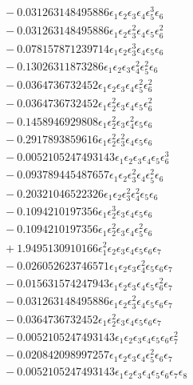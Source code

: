 \documentclass[10pt]{article}
\begin{document}
\begin{align*}
&{}  - 0.031263148495886 \epsilon_{1} \epsilon_{2} \epsilon_{3} \epsilon_{4} \epsilon_{5}^{3} \epsilon_{6} \\
&{}  - 0.031263148495886 \epsilon_{1} \epsilon_{2} \epsilon_{3}^{2} \epsilon_{4} \epsilon_{5} \epsilon_{6}^{2} \\
&{}  - 0.078157871239714 \epsilon_{1} \epsilon_{2} \epsilon_{3}^{3} \epsilon_{4} \epsilon_{5} \epsilon_{6} \\
&{}  - 0.13026311873286 \epsilon_{1} \epsilon_{2} \epsilon_{3} \epsilon_{4}^{2} \epsilon_{5}^{2} \epsilon_{6} \\
&{}  - 0.0364736732452 \epsilon_{1} \epsilon_{2} \epsilon_{3} \epsilon_{4} \epsilon_{5}^{2} \epsilon_{6}^{2} \\
&{}  - 0.0364736732452 \epsilon_{1} \epsilon_{2}^{2} \epsilon_{3} \epsilon_{4} \epsilon_{5} \epsilon_{6}^{2} \\
&{}  - 0.1458946929808 \epsilon_{1} \epsilon_{2}^{2} \epsilon_{3} \epsilon_{4}^{2} \epsilon_{5} \epsilon_{6} \\
&{}  - 0.2917893859616 \epsilon_{1} \epsilon_{2}^{2} \epsilon_{3}^{2} \epsilon_{4} \epsilon_{5} \epsilon_{6} \\
&{}  - 0.0052105247493143 \epsilon_{1} \epsilon_{2} \epsilon_{3} \epsilon_{4} \epsilon_{5} \epsilon_{6}^{3} \\
&{}  - 0.093789445487657 \epsilon_{1} \epsilon_{2} \epsilon_{3}^{2} \epsilon_{4} \epsilon_{5}^{2} \epsilon_{6} \\
&{}  - 0.20321046522326 \epsilon_{1} \epsilon_{2} \epsilon_{3}^{2} \epsilon_{4}^{2} \epsilon_{5} \epsilon_{6} \\
&{}  - 0.1094210197356 \epsilon_{1} \epsilon_{2}^{3} \epsilon_{3} \epsilon_{4} \epsilon_{5} \epsilon_{6} \\
&{}  - 0.1094210197356 \epsilon_{1} \epsilon_{2}^{2} \epsilon_{3} \epsilon_{4} \epsilon_{5}^{2} \epsilon_{6} \\
&{}  + 1.9495130910166 \epsilon_{1}^{2} \epsilon_{2} \epsilon_{3} \epsilon_{4} \epsilon_{5} \epsilon_{6} \epsilon_{7} \\
&{}  - 0.026052623746571 \epsilon_{1} \epsilon_{2} \epsilon_{3} \epsilon_{4}^{2} \epsilon_{5} \epsilon_{6} \epsilon_{7} \\
&{}  - 0.015631574247943 \epsilon_{1} \epsilon_{2} \epsilon_{3} \epsilon_{4} \epsilon_{5} \epsilon_{6}^{2} \epsilon_{7} \\
&{}  - 0.031263148495886 \epsilon_{1} \epsilon_{2} \epsilon_{3}^{2} \epsilon_{4} \epsilon_{5} \epsilon_{6} \epsilon_{7} \\
&{}  - 0.0364736732452 \epsilon_{1} \epsilon_{2}^{2} \epsilon_{3} \epsilon_{4} \epsilon_{5} \epsilon_{6} \epsilon_{7} \\
&{}  - 0.0052105247493143 \epsilon_{1} \epsilon_{2} \epsilon_{3} \epsilon_{4} \epsilon_{5} \epsilon_{6} \epsilon_{7}^{2} \\
&{}  - 0.020842098997257 \epsilon_{1} \epsilon_{2} \epsilon_{3} \epsilon_{4} \epsilon_{5}^{2} \epsilon_{6} \epsilon_{7} \\
&{}  - 0.0052105247493143 \epsilon_{1} \epsilon_{2} \epsilon_{3} \epsilon_{4} \epsilon_{5} \epsilon_{6} \epsilon_{7} \epsilon_{8}
\end{align*}
\end{document}
